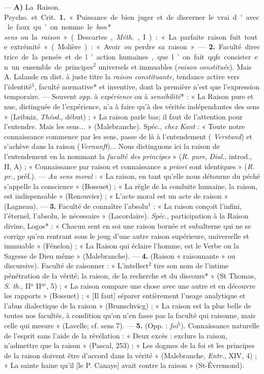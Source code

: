 \begin{itemize}[leftmargin=1cm, label=, itemsep=1pt]
 — {\bf A)} \si{La Raison}.  \si{Psycho.} et
\si{Crit.} {\bf 1.} « Puissance de bien juger et de discerner le vrai d'avec
le faux... qu’on nomme le {\it bon* sens} ou la {\it raison} » (Descartes,
{\it Méth.}, I) : « La parfaite raison fuit toute extrémité » (Molière): «
Avoir {\it ou} perdre sa raison ». — {\bf 2.} Faculté directrice de la pensée
et de l’action humaines, que l’on fait qqfs. consister en un ensemble de
principes$^2$ universels et immuables ({\it raison constituée}). Mais A.
Lalande en dist. à juste titre la {\it raison constituante}, tendance active
vers l'identité$^3$, faculté normative* et inventive, dont la première n’est
que l'expression temporaire. — Souvent {\it opp.} à {\it expérience} ou à {\it
sensibilité}* : « La Raison pure et nue, distinguée de l'expérience, n’a à
faire qu'à des vérités indépendantes des sens » (Leibniz, {\it Théod.},
début) ; « La raison parle bas; il faut de l'attention pour l’entendre. Mais
les sens... » (Malebranche). Spéc., {\it chez Kant} : « Toute notre
connaissance commence par les sens, passe de là à l’entendement ({\it
Verstand}) et s’achève dans la raison ({\it Vernunft})... Nous distinguons ici
la raison de l’entendement en la nommant la {\it faculté des principes}
» ({\it R. pure}, {\it Dial.}, introd., II, A) ; « Connaissance par raison et
connaissance {\it a priori} sont identiques » ({\it R. pr.}, préf.). — {\it
Au sens moral} : « La raison, en tant qu’elle nous détourne du péché
s'appelle la conscience » (Bossuet) ; « La règle de la conduite humaine, la
raison, est indispensable » (Renouvier) ; « L'acte moral est un acte de
raison » (Lagneau). — {\bf 3.} Faculté de connaître l'absolu$^1$ : « La
raison conçoit l'infini, l'éternel, l'absolu, le nécessaire » (Lacordaire).
{\it Spéc.}, participation à la Raison divine, Logos* : « Chacun sent en soi
une raison bornée et subalterne qui ne se corrige qu'en rentrant sous le joug
d’une autre raison supérieure, universelle et immuable » (Fénelon) ; « La
Raison qui éclaire l’homme, est le Verbe ou la Sagesse de Dieu même
» (Malebranche). — {\bf 4.} (Raison « raisonnante » ou discursive). Faculté
de raisonner : « L’intellect$^2$ tire son nom de l’intime pénétration de la
vérité; la raison, de la recherche et du discours* » (St Thomas, {\it S.
th.}, II$^\text{a}$ II$^\text{ae}$, 5) ; « La raison compare une chose avec
une autre et en découvre les rapports » (Bossuet) ; « [Il faut] séparer
entièrement l’usage analytique et l’abus dialectique de la raison
» (Brunschvicg) ; « La raison est la plus belle de toutes nos facultés, à
condition qu’on n’en fasse pas la faculté qui raisonne, mais celle qui mesure
» (Lavelle; cf. sens 7). — {\bf 5.} (Opp. : {\it foi}$^5$). Connaissance
naturelle de l’esprit sans l’aide de la révélation : « Deux excès : exclure
la raison, n’admettre que la raison » (Pascal, 253) ; « Les dogmes de la foi
et les principes de la raison doivent être d'accord dans la vérité
» (Malebranche, {\it Entr.}, XIV, 4) ; « La sainte haine qu’il [le P. Canaye]
avait contre la raison » (St-Évremond).


\end{itemize}

